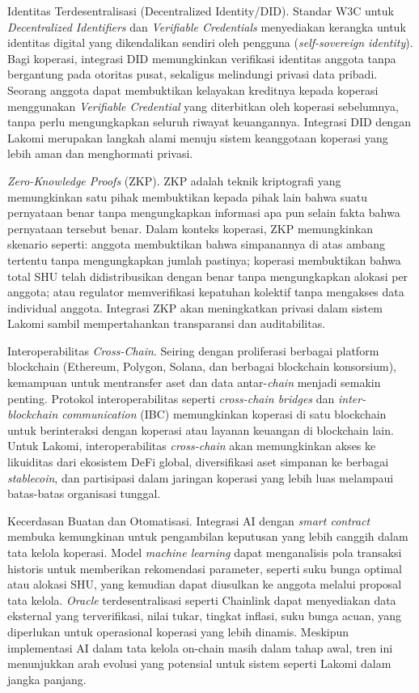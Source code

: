 Identitas Terdesentralisasi (Decentralized Identity/DID). Standar W3C untuk \textit{Decentralized Identifiers} dan \textit{Verifiable Credentials} menyediakan kerangka untuk identitas digital yang dikendalikan sendiri oleh pengguna (\textit{self-sovereign identity}). Bagi koperasi, integrasi DID memungkinkan verifikasi identitas anggota tanpa bergantung pada otoritas pusat, sekaligus melindungi privasi data pribadi. Seorang anggota dapat membuktikan kelayakan kreditnya kepada koperasi menggunakan \textit{Verifiable Credential} yang diterbitkan oleh koperasi sebelumnya, tanpa perlu mengungkapkan seluruh riwayat keuangannya. Integrasi DID dengan Lakomi merupakan langkah alami menuju sistem keanggotaan koperasi yang lebih aman dan menghormati privasi.

\textit{Zero-Knowledge Proofs} (ZKP). ZKP adalah teknik kriptografi yang memungkinkan satu pihak membuktikan kepada pihak lain bahwa suatu pernyataan benar tanpa mengungkapkan informasi apa pun selain fakta bahwa pernyataan tersebut benar. Dalam konteks koperasi, ZKP memungkinkan skenario seperti: anggota membuktikan bahwa simpanannya di atas ambang tertentu tanpa mengungkapkan jumlah pastinya; koperasi membuktikan bahwa total SHU telah didistribusikan dengan benar tanpa mengungkapkan alokasi per anggota; atau regulator memverifikasi kepatuhan kolektif tanpa mengakses data individual anggota. Integrasi ZKP akan meningkatkan privasi dalam sistem Lakomi sambil mempertahankan transparansi dan auditabilitas.

Interoperabilitas \textit{Cross-Chain}. Seiring dengan proliferasi berbagai platform blockchain (Ethereum, Polygon, Solana, dan berbagai blockchain konsorsium), kemampuan untuk mentransfer aset dan data antar-\textit{chain} menjadi semakin penting. Protokol interoperabilitas seperti \textit{cross-chain bridges} dan \textit{inter-blockchain communication} (IBC) memungkinkan koperasi di satu blockchain untuk berinteraksi dengan koperasi atau layanan keuangan di blockchain lain. Untuk Lakomi, interoperabilitas \textit{cross-chain} akan memungkinkan akses ke likuiditas dari ekosistem DeFi global, diversifikasi aset simpanan ke berbagai \textit{stablecoin}, dan partisipasi dalam jaringan koperasi yang lebih luas melampaui batas-batas organisasi tunggal.

Kecerdasan Buatan dan Otomatisasi. Integrasi AI dengan \textit{smart contract} membuka kemungkinan untuk pengambilan keputusan yang lebih canggih dalam tata kelola koperasi. Model \textit{machine learning} dapat menganalisis pola transaksi historis untuk memberikan rekomendasi parameter, seperti suku bunga optimal atau alokasi SHU, yang kemudian dapat diusulkan ke anggota melalui proposal tata kelola. \textit{Oracle} terdesentralisasi seperti Chainlink dapat menyediakan data eksternal yang terverifikasi, nilai tukar, tingkat inflasi, suku bunga acuan, yang diperlukan untuk operasional koperasi yang lebih dinamis. Meskipun implementasi AI dalam tata kelola on-chain masih dalam tahap awal, tren ini menunjukkan arah evolusi yang potensial untuk sistem seperti Lakomi dalam jangka panjang.

